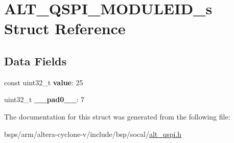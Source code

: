 \hypertarget{structALT__QSPI__MODULEID__s}{}\section{A\+L\+T\+\_\+\+Q\+S\+P\+I\+\_\+\+M\+O\+D\+U\+L\+E\+I\+D\+\_\+s Struct Reference}
\label{structALT__QSPI__MODULEID__s}
\subsection*{Data Fields}
\begin{DoxyCompactItemize}
\item 
\mbox{\label{structALT__QSPI__MODULEID__s_a2b67597cacb399ee3e32a8b799d95e49}} 
const uint32\+\_\+t {\bfseries value}\+: 25
\item 
\mbox{\label{structALT__QSPI__MODULEID__s_a98512b93a4afb9171c02d5eb3362c394}} 
uint32\+\_\+t {\bfseries \+\_\+\+\_\+pad0\+\_\+\+\_\+}\+: 7
\end{DoxyCompactItemize}


The documentation for this struct was generated from the following file\+:\begin{DoxyCompactItemize}
\item 
bsps/arm/altera-\/cyclone-\/v/include/bsp/socal/\mbox{\hyperlink{include_2bsp_2socal_2alt__qspi_8h}{alt\+\_\+qspi.\+h}}\end{DoxyCompactItemize}
